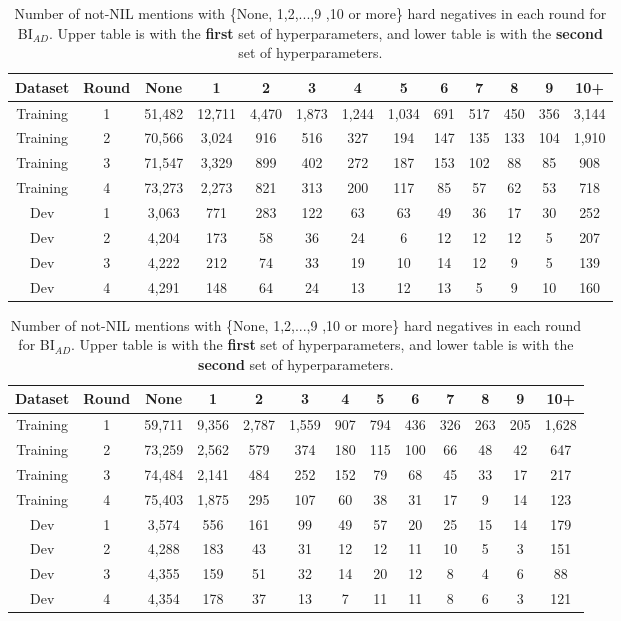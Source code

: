 \documentclass{report}
\theoremstyle{definition}
\theoremstyle{remark}
\begin{document}
\begin{table}
    \centering
    \hspace*{-1.2cm}\begin{tabular}{ccccccccccccc}
    Dataset  & Round & None & 1 & 2 & 3 & 4 & 5 & 6 & 7 & 8 & 9 & 10+ \\
    \hline
    Training & 1 & 51,482&12,711&4,470&1,873&1,244&1,034&691	&517&	450&356&3,144\\
    Training & 2 & 70,566&3,024	&916&	516	&327	&194&	147&	135	&133&	104&1,910\\
    Training & 3 & 71,547&3,329	&899&	402	&272	&187&	153&	102&	88&	85&908\\
    Training & 4 & 73,273&2,273	&821&	313	&200	&117&	85	&57	&62&	53&718\\
    \hline
    Dev & 1 & 3,063&771&283&	122&63	&63	&49&	36	&17&	30&252\\
    Dev & 2 &4,204&173&58	&36&24&	6	&12&	12	&12&	5 &207\\
    Dev & 3 & 4,222&212&74&	33&19	&10	&14&	12&	9&	5&139\\
    Dev & 4 & 4,291&148&64&	24&13	&12	&13&	5&	9&	10 &160\\
    \end{tabular}
    
    \vspace*{0.5cm}\hspace*{-1cm}\begin{tabular}{ccccccccccccc}
    Dataset  & Round & None & 1 & 2 & 3 & 4 & 5 & 6 & 7 & 8 & 9 & 10+ \\
    \hline
    Training & 1 & 59,711&9,356&2,787&1,559&907&794&436&326&263&205&1,628\\
    Training & 2 & 73,259&2,562&579&374&180&115&100&66&48&42&647\\
    Training & 3 & 74,484&2,141&484&252&152&79&68&45&33&17&217\\
    Training & 4 & 75,403&1,875&295&107&60&38&31&17&9&14&123\\
    \hline
    Dev & 1 & 3,574&556&161&99&49&57&20&25&15&14&179\\
    Dev & 2 &4,288&183&43&31&12&12&11&10&5&3&151\\
    Dev & 3 &4,355&159&51&32&14&20&12&8&4&6&88\\
    Dev & 4 &4,354&178&37&13&7&11&11&8&6&3&121 \\
    \end{tabular}
    
    \caption{Number of not-NIL mentions with \{None, 1,2,...,9 ,10 or more\} hard negatives in each round for BI$_{AD}$. Upper table is with the \textbf{first} set of hyperparameters, and lower table is with the \textbf{second} set of hyperparameters.}
    \label{tab:hardnegsbiencoder1}
\end{table}
\end{document}
